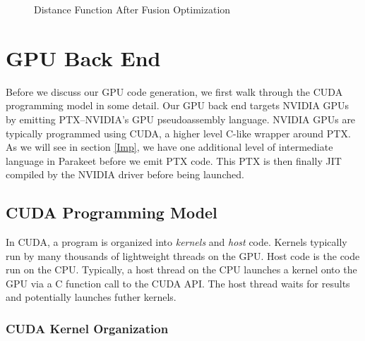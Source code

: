\documentclass[preprint]{sigplanconf}
\begin{document}
\begin{figure}[h!]

\caption{Distance Function After Fusion Optimization}
\label{DistFuse}
\end{figure}

\section{GPU Back End}
Before we discuss our GPU code generation, we first walk through the CUDA
programming model in some detail.  Our GPU back end targets NVIDIA GPUs by
emitting PTX--NVIDIA's GPU pseudoassembly language.  NVIDIA GPUs are typically
programmed using CUDA, a higher level C-like wrapper around PTX.  As we will
see in section \ref{Imp}, we have one additional level of intermediate language
in Parakeet before we emit PTX code.  This PTX is then finally JIT compiled by
the NVIDIA driver before being launched.

\subsection{CUDA Programming Model}

In CUDA, a program is organized into {\it kernels} and {\it host} code.
Kernels typically run by many thousands of
lightweight threads on the GPU.  Host code is the code run on the CPU.
Typically, a host thread on the CPU launches a kernel onto the GPU via a C
function call to the CUDA API.  The host thread waits for results and
potentially launches futher kernels.

\subsubsection{CUDA Kernel Organization}
\end{document}
